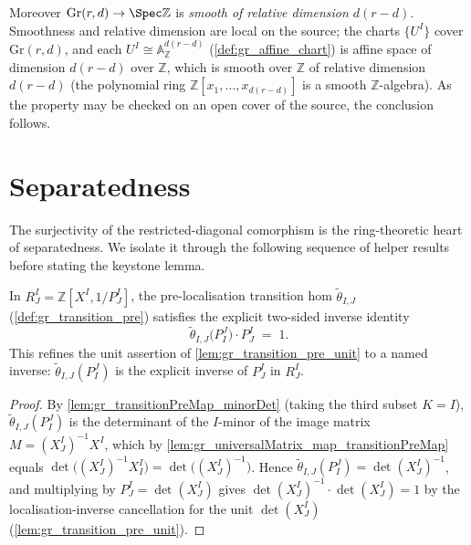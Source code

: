 \begin{definition}
  Moreover \(\mathrm{Gr}(r,d) \to \Spec \mathbb{Z}\) is \emph{smooth of relative
  dimension \(d(r-d)\)}. Smoothness and relative dimension are local on the
  source; the charts \(\{U^I\}\) cover \(\mathrm{Gr}(r,d)\), and each
  \(U^I \cong \mathbb{A}^{d(r-d)}_{\mathbb{Z}}\) (\cref{def:gr_affine_chart}) is
  affine space of dimension \(d(r-d)\) over \(\mathbb{Z}\), which is smooth over
  \(\mathbb{Z}\) of relative dimension \(d(r-d)\) (the polynomial ring
  \(\mathbb{Z}[x_1, \dots, x_{d(r-d)}]\) is a smooth \(\mathbb{Z}\)-algebra). As
  the property may be checked on an open cover of the source, the conclusion
  follows.
\end{definition}

\section{Separatedness}
\label{sec:gr_separated}

The surjectivity of the restricted-diagonal comorphism is the ring-theoretic
heart of separatedness. We isolate it through the following sequence of
helper results before stating the keystone lemma.

\begin{lemma}

\leanok
[Two-sided inverse identity \(\tilde\theta_{I,J}(P^J_I)\,P^I_J = 1\)]
  \label{lem:gr_transitionPreMap_minorDet_swap_mul}
  In \(R^I_J = \mathbb{Z}[X^I, 1/P^I_J]\), the pre-localisation transition hom
  \(\tilde\theta_{I,J}\) (\cref{def:gr_transition_pre}) satisfies the explicit
  two-sided inverse identity
  \[
    \tilde\theta_{I,J}\bigl(P^J_I\bigr) \cdot P^I_J \;=\; 1 .
  \]
  This refines the unit assertion of \cref{lem:gr_transition_pre_unit} to a named
  inverse: \(\tilde\theta_{I,J}(P^J_I)\) is the explicit inverse of \(P^I_J\) in
  \(R^I_J\).
\end{lemma}
\begin{proof}
  \leanok
  By \cref{lem:gr_transitionPreMap_minorDet} (taking the third subset \(K = I\)),
  \(\tilde\theta_{I,J}(P^J_I)\) is the determinant of the \(I\)-minor of the image
  matrix \(M = (X^I_J)^{-1} X^I\), which by
  \cref{lem:gr_universalMatrix_map_transitionPreMap} equals
  \(\det\bigl((X^I_J)^{-1} X^I_I\bigr) = \det\bigl((X^I_J)^{-1}\bigr)\). Hence
  \(\tilde\theta_{I,J}(P^J_I) = \det(X^I_J)^{-1}\), and multiplying by \(P^I_J =
  \det(X^I_J)\) gives \(\det(X^I_J)^{-1} \cdot \det(X^I_J) = 1\) by the
  localisation-inverse cancellation for the unit \(\det(X^I_J)\)
  (\cref{lem:gr_transition_pre_unit}).
\end{proof}

